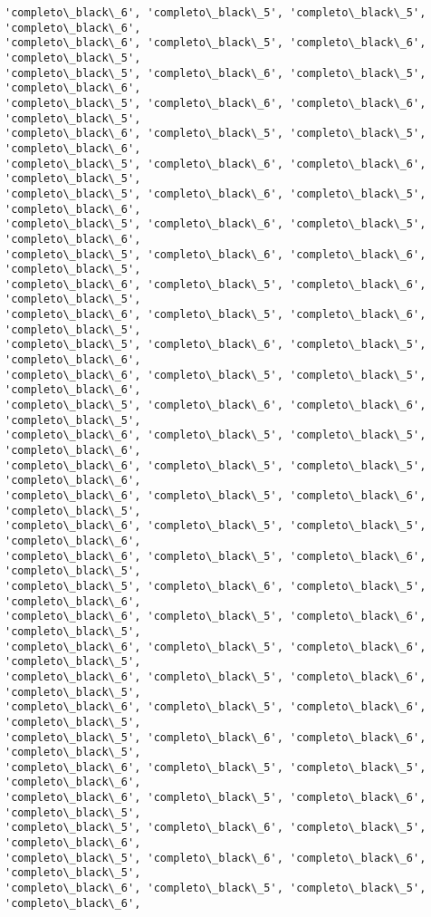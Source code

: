 \documentclass[11pt]{article}
\begin{document}
\begin{Verbatim}[commandchars=\\\{\}]
'completo\_black\_6', 'completo\_black\_5', 'completo\_black\_5', 'completo\_black\_6',
'completo\_black\_6', 'completo\_black\_5', 'completo\_black\_6', 'completo\_black\_5',
'completo\_black\_5', 'completo\_black\_6', 'completo\_black\_5', 'completo\_black\_6',
'completo\_black\_5', 'completo\_black\_6', 'completo\_black\_6', 'completo\_black\_5',
'completo\_black\_6', 'completo\_black\_5', 'completo\_black\_5', 'completo\_black\_6',
'completo\_black\_5', 'completo\_black\_6', 'completo\_black\_6', 'completo\_black\_5',
'completo\_black\_5', 'completo\_black\_6', 'completo\_black\_5', 'completo\_black\_6',
'completo\_black\_5', 'completo\_black\_6', 'completo\_black\_5', 'completo\_black\_6',
'completo\_black\_5', 'completo\_black\_6', 'completo\_black\_6', 'completo\_black\_5',
'completo\_black\_6', 'completo\_black\_5', 'completo\_black\_6', 'completo\_black\_5',
'completo\_black\_6', 'completo\_black\_5', 'completo\_black\_6', 'completo\_black\_5',
'completo\_black\_5', 'completo\_black\_6', 'completo\_black\_5', 'completo\_black\_6',
'completo\_black\_6', 'completo\_black\_5', 'completo\_black\_5', 'completo\_black\_6',
'completo\_black\_5', 'completo\_black\_6', 'completo\_black\_6', 'completo\_black\_5',
'completo\_black\_6', 'completo\_black\_5', 'completo\_black\_5', 'completo\_black\_6',
'completo\_black\_6', 'completo\_black\_5', 'completo\_black\_5', 'completo\_black\_6',
'completo\_black\_6', 'completo\_black\_5', 'completo\_black\_6', 'completo\_black\_5',
'completo\_black\_6', 'completo\_black\_5', 'completo\_black\_5', 'completo\_black\_6',
'completo\_black\_6', 'completo\_black\_5', 'completo\_black\_6', 'completo\_black\_5',
'completo\_black\_5', 'completo\_black\_6', 'completo\_black\_5', 'completo\_black\_6',
'completo\_black\_6', 'completo\_black\_5', 'completo\_black\_6', 'completo\_black\_5',
'completo\_black\_6', 'completo\_black\_5', 'completo\_black\_6', 'completo\_black\_5',
'completo\_black\_6', 'completo\_black\_5', 'completo\_black\_6', 'completo\_black\_5',
'completo\_black\_6', 'completo\_black\_5', 'completo\_black\_6', 'completo\_black\_5',
'completo\_black\_5', 'completo\_black\_6', 'completo\_black\_6', 'completo\_black\_5',
'completo\_black\_6', 'completo\_black\_5', 'completo\_black\_5', 'completo\_black\_6',
'completo\_black\_6', 'completo\_black\_5', 'completo\_black\_6', 'completo\_black\_5',
'completo\_black\_5', 'completo\_black\_6', 'completo\_black\_5', 'completo\_black\_6',
'completo\_black\_5', 'completo\_black\_6', 'completo\_black\_6', 'completo\_black\_5',
'completo\_black\_6', 'completo\_black\_5', 'completo\_black\_5', 'completo\_black\_6',

\end{Verbatim}
\end{document}
